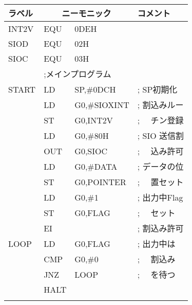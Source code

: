\begin{figure}[btp]
{\small\tt\begin{center}
\begin{tabular}{|l|l l l|} \hline
ラベル & \multicolumn{2}{|c}{ニーモニック} & コメント  \\
\hline
INT2V   & EQU   & 0DEH               &                   \\
SIOD    & EQU   & 02H                &                   \\
SIOC    & EQU   & 03H                &                   \\
        & \multicolumn{3}{|l|}{;メインプログラム}        \\
START   & LD    & SP,\#0DCH          & ; SP初期化        \\
        & LD    & G0,\#SIOXINT       & ; 割込みルー      \\
        & ST    & G0,INT2V           & ; 　チン登録      \\
        & LD    & G0,\#80H           & ; SIO 送信割      \\
        & OUT   & G0,SIOC            & ; 　込み許可      \\
        & LD    & G0,\#DATA          & ; データの位      \\
        & ST    & G0,POINTER         & ; 　置セット      \\
        & LD    & G0,\#1             & ; 出力中Flag      \\
        & ST    & G0,FLAG            & ; 　セット        \\
        & EI    &                    & ; 割込み許可      \\
LOOP    & LD    & G0,FLAG            & ; 出力中は        \\
        & CMP   & G0,\#0             & ; 　割込み        \\
        & JNZ   & LOOP               & ; 　を待つ        \\
        & HALT  &                    &                   \\
        &       &                    &                   \\

\end{tabular}
\end{center}}
\end{figure}
